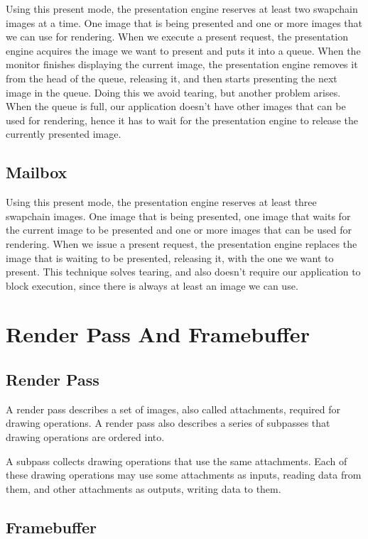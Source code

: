 Using this present mode, the presentation engine reserves at least two
swapchain images at a time.
One image that is being presented and one or more images that we can use for
rendering.
When we execute a present request, the presentation engine acquires
the image we want to present and puts it into a queue.
When the monitor finishes displaying the current image, the presentation engine
removes it from the head of the queue, releasing it, and then starts
presenting the next image in the queue.
Doing this we avoid tearing, but another problem arises.
When the queue is full, our application doesn't have other images that can
be used for rendering, hence it has to wait for the presentation engine
to release the currently presented image.

\subsection{Mailbox}

Using this present mode, the presentation engine reserves at least three
swapchain images.
One image that is being presented, one image that waits for the current image
to be presented and one or more images that can be used for rendering.
When we issue a present request, the presentation engine replaces the
image that is waiting to be presented, releasing it, with the one we want
to present.
This technique solves tearing, and also doesn't require our application to
block execution, since there is always at least an image we can use.

\section{Render Pass And Framebuffer}

\subsection{Render Pass}

A render pass describes a set of images, also called attachments, required
for drawing operations.
A render pass also describes a series of subpasses that drawing operations
are ordered into.

A subpass collects drawing operations that use the same attachments.
Each of these drawing operations may use some attachments as inputs,
reading data from them, and other attachments as outputs, writing data to them.

\subsection{Framebuffer}

